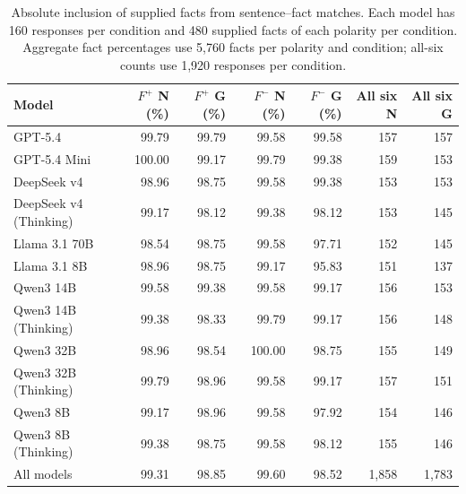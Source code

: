 \begin{table}[t]
\centering
\small
\setlength{\tabcolsep}{3pt}
\begin{tabular}{lrrrrrr}
\toprule
Model & $F^+$ N (\%) & $F^+$ G (\%) & $F^-$ N (\%) & $F^-$ G (\%) & All six N & All six G \\
\midrule
GPT-5.4 & 99.79 & 99.79 & 99.58 & 99.58 & 157 & 157 \\
GPT-5.4 Mini & 100.00 & 99.17 & 99.79 & 99.38 & 159 & 153 \\
DeepSeek v4 & 98.96 & 98.75 & 99.58 & 99.38 & 153 & 153 \\
DeepSeek v4 (Thinking) & 99.17 & 98.12 & 99.38 & 98.12 & 153 & 145 \\
Llama 3.1 70B & 98.54 & 98.75 & 99.58 & 97.71 & 152 & 145 \\
Llama 3.1 8B & 98.96 & 98.75 & 99.17 & 95.83 & 151 & 137 \\
Qwen3 14B & 99.58 & 99.38 & 99.58 & 99.17 & 156 & 153 \\
Qwen3 14B (Thinking) & 99.38 & 98.33 & 99.79 & 99.17 & 156 & 148 \\
Qwen3 32B & 98.96 & 98.54 & 100.00 & 98.75 & 155 & 149 \\
Qwen3 32B (Thinking) & 99.79 & 98.96 & 99.58 & 99.17 & 157 & 151 \\
Qwen3 8B & 99.17 & 98.96 & 99.58 & 97.92 & 154 & 146 \\
Qwen3 8B (Thinking) & 99.38 & 98.75 & 99.58 & 98.12 & 155 & 146 \\
All models & 99.31 & 98.85 & 99.60 & 98.52 & 1,858 & 1,783 \\
\bottomrule
\end{tabular}
\caption{Absolute inclusion of supplied facts from sentence--fact matches. Each model has 160 responses per condition and 480 supplied facts of each polarity per condition. Aggregate fact percentages use 5,760 facts per polarity and condition; all-six counts use 1,920 responses per condition.}
\label{tab:absolute_coverage}
\end{table}
